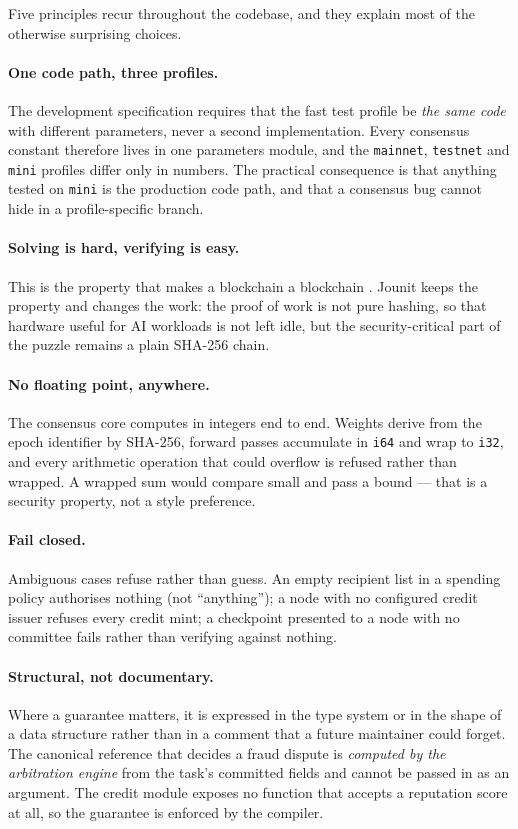 \documentclass{article}
\begin{document}
Five principles recur throughout the codebase, and they explain most of the
otherwise surprising choices.

\paragraph{One code path, three profiles.} The development specification
requires that the fast test profile be \emph{the same code} with different
parameters, never a second implementation. Every consensus constant therefore
lives in one parameters module, and the \texttt{mainnet}, \texttt{testnet} and
\texttt{mini} profiles differ only in numbers. The practical consequence is that
anything tested on \texttt{mini} is the production code path, and that a
consensus bug cannot hide in a profile-specific branch.

\paragraph{Solving is hard, verifying is easy.} This is the property that makes
a blockchain a blockchain \cite{nakamoto2008bitcoin}. Jounit keeps the property
and changes the work: the proof of work is not pure hashing, so that hardware
useful for AI workloads is not left idle, but the security-critical part of the
puzzle remains a plain SHA-256 chain.

\paragraph{No floating point, anywhere.} The consensus core computes in integers
end to end. Weights derive from the epoch identifier by SHA-256, forward passes
accumulate in \texttt{i64} and wrap to \texttt{i32}, and every arithmetic
operation that could overflow is refused rather than wrapped. A wrapped sum
would compare small and pass a bound --- that is a security property, not a
style preference.

\paragraph{Fail closed.} Ambiguous cases refuse rather than guess. An empty
recipient list in a spending policy authorises nothing (not ``anything''); a
node with no configured credit issuer refuses every credit mint; a checkpoint
presented to a node with no committee fails rather than verifying against
nothing.

\paragraph{Structural, not documentary.} Where a guarantee matters, it is
expressed in the type system or in the shape of a data structure rather than in
a comment that a future maintainer could forget. The canonical reference that
decides a fraud dispute is \emph{computed by the arbitration engine} from the
task's committed fields and cannot be passed in as an argument. The credit
module exposes no function that accepts a reputation score at all, so the
guarantee is enforced by the compiler.
\end{document}
